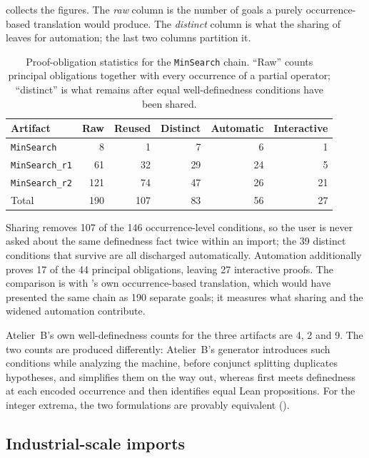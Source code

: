  collects the figures.
The \emph{raw} column is the number of goals a purely occurrence-based translation would produce.
The \emph{distinct} column is what the sharing of  leaves for
automation; the last two columns partition it.

\begin{table}[t]
  \centering
  \small
  \begin{tabular}{lrrrrr}
    \toprule
    Artifact & Raw & Reused & Distinct & Automatic & Interactive \\
    \midrule
    \texttt{MinSearch}     &   8 &   1 &  7 &  6 &  1 \\
    \texttt{MinSearch\_r1} &  61 &  32 & 29 & 24 &  5 \\
    \texttt{MinSearch\_r2} & 121 &  74 & 47 & 26 & 21 \\
    \midrule
    Total                  & 190 & 107 & 83 & 56 & 27 \\
    \bottomrule
  \end{tabular}
  \caption{Proof-obligation statistics for the \texttt{MinSearch} chain. ``Raw'' counts
    principal obligations together with every occurrence of a partial operator; ``distinct''
    is what remains after equal well-definedness conditions have been shared.}
  \label{tab:barrel-minsearch-results}
\end{table}

Sharing removes 107 of the 146 occurrence-level conditions, so the user is never asked
about the same definedness fact twice within an import; the 39 distinct conditions that
survive are all discharged automatically.
Automation additionally proves 17 of the 44 principal obligations, leaving 27 interactive
proofs.
The comparison is with \barrel{}'s own occurrence-based translation, which would have
presented the same chain as 190 separate goals; it measures what sharing and the widened
automation contribute.

Atelier~B's own well-definedness counts for the three artifacts are 4, 2 and 9.
The two counts are produced differently: Atelier~B's generator introduces such conditions
while analyzing the machine, before conjunct splitting duplicates hypotheses, and
simplifies them on the way out, whereas \barrel{} first meets definedness at each encoded
occurrence and then identifies equal Lean propositions.
For the integer extrema, the two formulations are provably equivalent
().

\subsection{Industrial-scale imports}
\label{subsec:barrel-industrial-scale}

